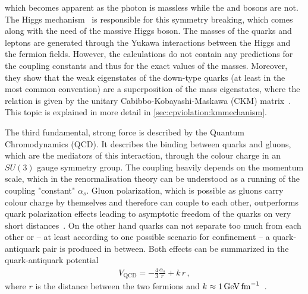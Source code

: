 which becomes apparent as the photon is massless while the \Wpm and \Z bosons
are not. The Higgs mechanism~\cite{Higgs:1964pj} is responsible for this
symmetry breaking, which comes along with the need of the massive Higgs boson.
The masses of the quarks and leptons are generated through the Yukawa
interactions between the Higgs and the fermion fields. However, the
calculations do not contain any predictions for the coupling constants and
thus for the exact values of the masses. Moreover, they show that the weak
eigenstates of the down-type quarks (at least in the most common convention)
are a superposition of the mass eigenstates, where the relation is given by
the unitary Cabibbo-Kobayashi-Maskawa (CKM) matrix~\cite{Kobayashi:1973fv}.
This topic is explained in more detail in \cref{sec:cpviolation:kmmechanism}.


The third fundamental, strong force is described by the Quantum Chromodynamics
(QCD). It describes the binding between quarks and gluons, which are the
mediators of this interaction, through the colour charge in an $SU(3)$ gauge
symmetry group. The coupling heavily depends on the momentum scale, which in
the renormalisation theory can be understood as a running of the coupling
"constant" $\alpha_s$. Gluon polarization, which is possible as gluons carry
colour charge by themselves and therefore can couple to each other,
outperforms quark polarization effects leading to asymptotic freedom of the
quarks on very short
distances~\cite{AsymptoticFreedom_GrossWilczek,AsymptoticFreedom_Politzer}. On
the other hand quarks can not separate too much from each other or -- at least
according to one possible scenario for confinement -- a quark-antiquark pair
is produced in between. Both effects can be summarized in the quark-antiquark
potential
\begin{align}
	V_{\mathrm{QCD}} = - \frac 43 \frac{\alpha_s}{r} + k\,r\,,
\end{align}
where $r$ is the distance between the two fermions and $k \approx
\SI{1}{\GeV\fm^{-1}}$~\cite{Perkins:1982xb}.